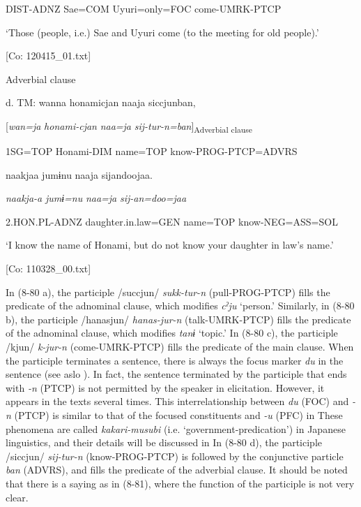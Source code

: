       DIST-ADNZ  Sae=COM  Uyuri=only=FOC  come-UMRK-PTCP

      ‘Those (people, i.e.) Sae and Uyuri come (to the meeting for old people).’

      [Co: 120415\_01.txt]

  Adverbial clause

  d.  TM:  wanna  honami{\textbar}cjan{\textbar}  naaja  siccjunban,

      [\textit{wan=ja}  \textit{honami-cjan}  \textit{naa=ja}  \textit{sij-tur-n=ban}]\textsubscript{Adverbial clause}

      1SG=TOP  Honami-DIM  name=TOP  know-PROG-PTCP=ADVRS

      naakjaa  jumɨnu  naaja  sijandoojaa.

      \textit{naakja-a}  \textit{jumɨ=nu}  \textit{naa=ja}  \textit{sij-an=doo=jaa}

      2.HON.PL-ADNZ  daughter.in.law=GEN  name=TOP  know-NEG=ASS=SOL

      ‘I know the name of Honami, but do not know your daughter in law’s name.’

      [Co: 110328\_00.txt]

In (8-80 a), the participle /succjun/ \textit{sukk-tur-n} (pull-PROG-PTCP) fills the predicate of the adnominal clause, which modifies \textit{cˀju} ‘person.’ Similarly, in (8-80 b), the participle /hanasjun/ \textit{hanas-jur-n} (talk-UMRK-PTCP) fills the predicate of the adnominal clause, which modifies \textit{tanɨ} ‘topic.’ In (8-80 c), the participle /kjun/ \textit{k-jur-n} (come-UMRK-PTCP) fills the predicate of the main clause. When the participle terminates a sentence, there is always the focus marker \textit{du} in the sentence (see aslo ). In fact, the sentence terminated by the participle that ends with \textit{{}-n} (PTCP) is not permitted by the speaker in elicitation. However, it appears in the texts several times. This interrelationship between \textit{du} (FOC) and \textit{{}-n} (PTCP) is similar to that of the focused constituents and \textit{-u} (PFC) in  These phenomena are called \textit{kakari-musubi} (i.e. ‘government-predication’) in Japanese linguistics, and their details will be discussed in  In (8-80 d), the participle /siccjun/ \textit{sij-tur-n} (know-PROG-PTCP) is followed by the conjunctive particle \textit{ban} (ADVRS), and fills the predicate of the adverbial clause. It should be noted that there is a saying as in (8-81), where the function of the participle is not very clear.

